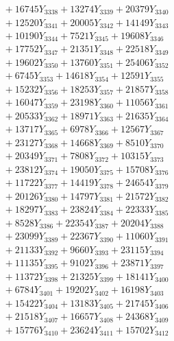 \documentclass[a4paper,10pt]{article}
\begin{document}
{\begin{align}
&\;  + 16745 Y_{3338} + 13274 Y_{3339} + 20379 Y_{3340} \\[0.3ex]
&\;  + 12520 Y_{3341} + 20005 Y_{3342} + 14149 Y_{3343} \\[0.3ex]
&\;  + 10190 Y_{3344} + 7521 Y_{3345} + 19608 Y_{3346} \\[0.3ex]
&\;  + 17752 Y_{3347} + 21351 Y_{3348} + 22518 Y_{3349} \\[0.3ex]
&\;  + 19602 Y_{3350} + 13760 Y_{3351} + 25406 Y_{3352} \\[0.3ex]
&\;  + 6745 Y_{3353} + 14618 Y_{3354} + 12591 Y_{3355} \\[0.3ex]
&\;  + 15232 Y_{3356} + 18253 Y_{3357} + 21857 Y_{3358} \\[0.5ex]\allowbreak
&\;  + 16047 Y_{3359} + 23198 Y_{3360} + 11056 Y_{3361} \\[0.3ex]
&\;  + 20533 Y_{3362} + 18971 Y_{3363} + 21635 Y_{3364} \\[0.3ex]
&\;  + 13717 Y_{3365} + 6978 Y_{3366} + 12567 Y_{3367} \\[0.3ex]
&\;  + 23127 Y_{3368} + 14668 Y_{3369} + 8510 Y_{3370} \\[0.3ex]
&\;  + 20349 Y_{3371} + 7808 Y_{3372} + 10315 Y_{3373} \\[0.3ex]
&\;  + 23812 Y_{3374} + 19050 Y_{3375} + 15708 Y_{3376} \\[0.3ex]
&\;  + 11722 Y_{3377} + 14419 Y_{3378} + 24654 Y_{3379} \\[0.3ex]
&\;  + 20126 Y_{3380} + 14797 Y_{3381} + 21572 Y_{3382} \\[0.3ex]
&\;  + 18297 Y_{3383} + 23824 Y_{3384} + 22333 Y_{3385} \\[0.3ex]
&\;  + 8528 Y_{3386} + 22354 Y_{3387} + 20204 Y_{3388} \\[0.5ex]\allowbreak
&\;  + 23099 Y_{3389} + 22367 Y_{3390} + 11060 Y_{3391} \\[0.3ex]
&\;  + 21133 Y_{3392} + 9660 Y_{3393} + 23115 Y_{3394} \\[0.3ex]
&\;  + 11135 Y_{3395} + 9102 Y_{3396} + 23871 Y_{3397} \\[0.3ex]
&\;  + 11372 Y_{3398} + 21325 Y_{3399} + 18141 Y_{3400} \\[0.3ex]
&\;  + 6784 Y_{3401} + 19202 Y_{3402} + 16198 Y_{3403} \\[0.3ex]
&\;  + 15422 Y_{3404} + 13183 Y_{3405} + 21745 Y_{3406} \\[0.3ex]
&\;  + 21518 Y_{3407} + 16657 Y_{3408} + 24368 Y_{3409} \\[0.3ex]
&\;  + 15776 Y_{3410} + 23624 Y_{3411} + 15702 Y_{3412} \\[0.3ex]

\end{align}}
\end{document}
